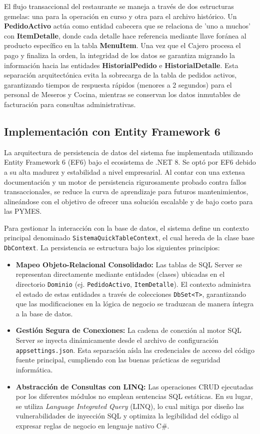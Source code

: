 El flujo transaccional del restaurante se maneja a través de dos estructuras gemelas: una para la operación en curso y otra para el archivo histórico. Un \textbf{PedidoActivo} actúa como entidad cabecera que se relaciona de 'uno a muchos' con \textbf{ItemDetalle}, donde cada detalle hace referencia mediante llave foránea al producto específico en la tabla \textbf{MenuItem}. Una vez que el Cajero procesa el pago y finaliza la orden, la integridad de los datos se garantiza migrando la información hacia las entidades \textbf{HistorialPedido} e \textbf{HistorialDetalle}. Esta separación arquitectónica evita la sobrecarga de la tabla de pedidos activos, garantizando tiempos de respuesta rápidos (menores a 2 segundos) para el personal de Meseros y Cocina, mientras se conservan los datos inmutables de facturación para consultas administrativas.

\subsection{Implementación con Entity Framework 6}
La arquitectura de persistencia de datos del sistema fue implementada utilizando Entity Framework 6 (EF6) bajo el ecosistema de .NET 8. Se optó por EF6 debido a su alta madurez y estabilidad a nivel empresarial. Al contar con una extensa documentación y un motor de persistencia rigurosamente probado contra fallos transaccionales, se reduce la curva de aprendizaje para futuros mantenimientos, alineándose con el objetivo de ofrecer una solución escalable y de bajo costo para las PYMES.

Para gestionar la interacción con la base de datos, el sistema define un contexto principal denominado \texttt{SistemaQuickTableContext}, el cual hereda de la clase base \texttt{DbContext}. La persistencia se estructura bajo los siguientes principios:

\begin{itemize}
	\item \textbf{Mapeo Objeto-Relacional Consolidado:} Las tablas de SQL Server se representan directamente mediante entidades (clases) ubicadas en el directorio \texttt{Dominio} (ej. \texttt{PedidoActivo}, \texttt{ItemDetalle}). El contexto administra el estado de estas entidades a través de colecciones \texttt{DbSet<T>}, garantizando que las modificaciones en la lógica de negocio se traduzcan de manera íntegra a la base de datos.
	\item \textbf{Gestión Segura de Conexiones:} La cadena de conexión al motor SQL Server se inyecta dinámicamente desde el archivo de configuración \texttt{appsettings.json}. Esta separación aísla las credenciales de acceso del código fuente principal, cumpliendo con las buenas prácticas de seguridad informática.
	\item \textbf{Abstracción de Consultas con LINQ:} Las operaciones CRUD ejecutadas por los diferentes módulos no emplean sentencias SQL estáticas. En su lugar, se utiliza \textit{Language Integrated Query} (LINQ), lo cual mitiga por diseño las vulnerabilidades de inyección SQL y optimiza la legibilidad del código al expresar reglas de negocio en lenguaje nativo C\#.
\end{itemize}


